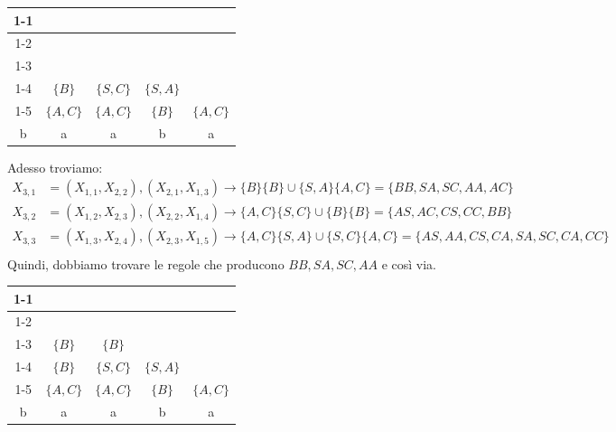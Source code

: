 \documentclass[12pt]{report}
\begin{document}
\begin{example}{}{}
\begin{center}
\begin{tabular}{ccccc}
\cline{1-1}
\multicolumn{1}{|c|}{} &  &  &  & \\ \cline{1-2}
\multicolumn{1}{|c|}{} & \multicolumn{1}{c|}{} &  &  & \\ \cline{1-3}
\multicolumn{1}{|c|}{} & \multicolumn{1}{c|}{} & \multicolumn{1}{c|}{} &  & \\ \cline{1-4}
\multicolumn{1}{|c|}{$\{S, A\}$} & \multicolumn{1}{c|}{$\{B\}$} & \multicolumn{1}{c|}{$\{S, C\}$} & \multicolumn{1}{c|}{$\{S, A\}$} & \\ \cline{1-5}
\multicolumn{1}{|c|}{$\{B\}$} & \multicolumn{1}{c|}{$\{A, C\}$} & \multicolumn{1}{c|}{$\{A, C\}$} & \multicolumn{1}{c|}{$\{B\}$} & \multicolumn{1}{c|}{$\{A, C\}$} \\ \hline
\rule{0pt}{15pt} b & a & a & b & a
\end{tabular}
\end{center}
Adesso troviamo:
\begin{align*}
	X_{3, 1} &= (X_{1,1}, X_{2,2}), (X_{2, 1}, X_{1, 3}) \to \{B\}\{B\} \cup \{S, A\}\{A, C\} = \{BB, SA, SC, AA, AC\} \\
	X_{3, 2} &= (X_{1,2}, X_{2,3}), (X_{2, 2}, X_{1, 4}) \to \{A, C\}\{S, C\} \cup \{B\}\{B\} = \{AS, AC, CS, CC, BB\} \\
	X_{3, 3} &= (X_{1,3}, X_{2,4}), (X_{2, 3}, X_{1, 5}) \to \{A, C\}\{S, A\} \cup \{S, C\}\{A, C\} = \{AS, AA, CS, CA, SA, SC, CA, CC\} \\
	\end{align*}
Quindi, dobbiamo trovare le regole che producono $BB, SA, SC, AA$ e così via.
\begin{center}
\begin{tabular}{ccccc}
\cline{1-1}
\multicolumn{1}{|c|}{} &  &  &  & \\ \cline{1-2}
\multicolumn{1}{|c|}{} & \multicolumn{1}{c|}{} &  &  & \\ \cline{1-3}
\multicolumn{1}{|c|}{$\emptyset$} & \multicolumn{1}{c|}{$\{B\}$} & \multicolumn{1}{c|}{$\{B\}$} &  & \\ \cline{1-4}
\multicolumn{1}{|c|}{$\{S, A\}$} & \multicolumn{1}{c|}{$\{B\}$} & \multicolumn{1}{c|}{$\{S, C\}$} & \multicolumn{1}{c|}{$\{S, A\}$} & \\ \cline{1-5}
\multicolumn{1}{|c|}{$\{B\}$} & \multicolumn{1}{c|}{$\{A, C\}$} & \multicolumn{1}{c|}{$\{A, C\}$} & \multicolumn{1}{c|}{$\{B\}$} & \multicolumn{1}{c|}{$\{A, C\}$} \\ \hline
\rule{0pt}{15pt} b & a & a & b & a
\end{tabular}

\end{center}
\end{example}
\end{document}
